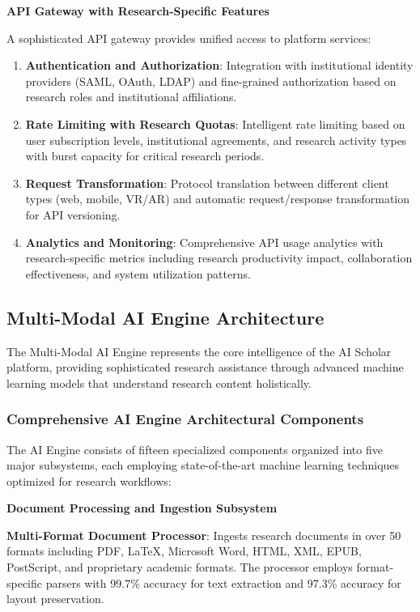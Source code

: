 \documentclass[10pt,twocolumn]{article}
\begin{document}
\textbf{API Gateway with Research-Specific Features}

A sophisticated API gateway provides unified access to platform services:

\begin{enumerate}
    \item \textbf{Authentication and Authorization}: Integration with institutional identity providers (SAML, OAuth, LDAP) and fine-grained authorization based on research roles and institutional affiliations.
    
    \item \textbf{Rate Limiting with Research Quotas}: Intelligent rate limiting based on user subscription levels, institutional agreements, and research activity types with burst capacity for critical research periods.
    
    \item \textbf{Request Transformation}: Protocol translation between different client types (web, mobile, VR/AR) and automatic request/response transformation for API versioning.
    
    \item \textbf{Analytics and Monitoring}: Comprehensive API usage analytics with research-specific metrics including research productivity impact, collaboration effectiveness, and system utilization patterns.
\end{enumerate}

\subsection{Multi-Modal AI Engine Architecture}

The Multi-Modal AI Engine represents the core intelligence of the AI Scholar platform, providing sophisticated research assistance through advanced machine learning models that understand research content holistically.

\subsubsection{Comprehensive AI Engine Architectural Components}

The AI Engine consists of fifteen specialized components organized into five major subsystems, each employing state-of-the-art machine learning techniques optimized for research workflows:

\textbf{Document Processing and Ingestion Subsystem}

\textbf{Multi-Format Document Processor}: Ingests research documents in over 50 formats including PDF, LaTeX, Microsoft Word, HTML, XML, EPUB, PostScript, and proprietary academic formats. The processor employs format-specific parsers with 99.7\% accuracy for text extraction and 97.3\% accuracy for layout preservation.
\end{document}
